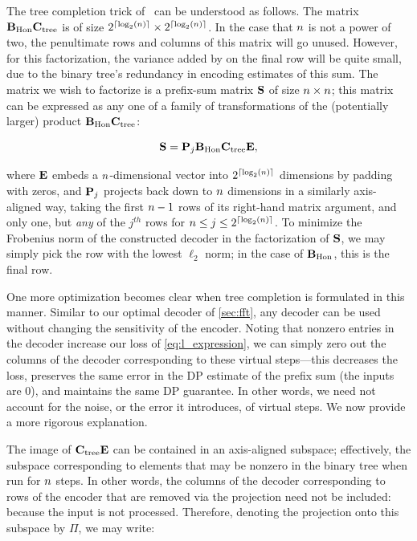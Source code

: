 \documentclass{article} %
\theoremstyle{named}
\begin{document}
The tree completion trick of~\citep{Kairouz-extremal} can be understood as follows. The matrix $\mathbf{B}_{\text{Hon}} \mathbf{C}_{\text{tree}}$ is of size $2^{\lceil \log_2(n)\rceil} \times 2^{\lceil \log_2(n)\rceil}$. In the case that $n$ is not a power of two, the penultimate  rows and columns of this matrix will go unused. However, for this factorization, the variance added by \hondecoder on the final row will be quite small, due to the binary tree's redundancy in encoding estimates of this sum. The matrix we wish to factorize is a prefix-sum matrix $\mathbf{S}$ of size $n \times n$; this matrix can be expressed as any one of a family of transformations of the (potentially larger) product $\mathbf{B}_{\text{Hon}} \mathbf{C}_{\text{tree}}$:

$$\mathbf{S} = \mathbf{P}_j \mathbf{B}_{\text{Hon}} \mathbf{C}_{\text{tree}} \mathbf{E},$$

where $\mathbf{E}$ embeds a $n$-dimensional vector into $2^{\lceil \log_2(n)\rceil}$ dimensions by padding with zeros, and $\mathbf{P}_j$ projects back down to $n$ dimensions in a similarly axis-aligned way, taking the first $n-1$ rows of its right-hand matrix argument, and only one, but \emph{any} of the $j^{th}$ rows for $n \leq j \leq 2^{\lceil \log_2(n)\rceil}$.
To minimize the Frobenius norm of the constructed decoder in the factorization of $\mathbf{S}$, we may simply pick the row with the lowest $\ell_2$ norm; in the case of $\mathbf{B}_{\text{Hon}}$, this is the final row.

One more optimization becomes clear when tree completion is formulated in this manner.
Similar to our optimal decoder of \cref{sec:fft}, any decoder can be used without changing the sensitivity of the encoder. Noting that nonzero entries in the decoder increase our loss of \cref{eq:l_expression}, we can simply zero out the columns of the decoder corresponding to these virtual steps---this decreases the loss, preserves the same error in the DP estimate of the prefix sum (the inputs are 0), and maintains the same DP guarantee. In other words, we need not account for the noise, or the error it introduces, of virtual steps. We now provide a more rigorous explanation.

The image of $\mathbf{C}_{\text{tree}} \mathbf{E}$ can be contained in an axis-aligned subspace; effectively, the subspace corresponding to elements that may be nonzero in the binary tree when run for $n$ steps. 
In other words, the columns of the decoder corresponding to rows of the encoder that are removed via the projection need not be included: because the input is not processed.
Therefore, denoting the projection onto this subspace by $\Pi$,  we may write:
\end{document}
